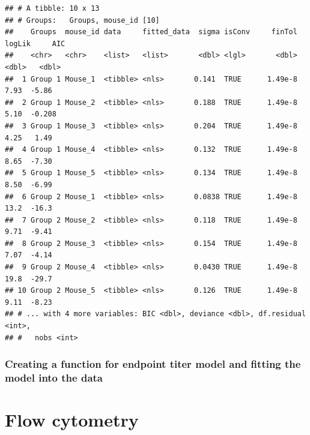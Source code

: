 \documentclass[
]{book}
\begin{document}
\begin{verbatim}
## # A tibble: 10 x 13
## # Groups:   Groups, mouse_id [10]
##    Groups  mouse_id data     fitted_data  sigma isConv     finTol logLik     AIC
##    <chr>   <chr>    <list>   <list>       <dbl> <lgl>       <dbl>  <dbl>   <dbl>
##  1 Group 1 Mouse_1  <tibble> <nls>       0.141  TRUE      1.49e-8   7.93  -5.86 
##  2 Group 1 Mouse_2  <tibble> <nls>       0.188  TRUE      1.49e-8   5.10  -0.208
##  3 Group 1 Mouse_3  <tibble> <nls>       0.204  TRUE      1.49e-8   4.25   1.49 
##  4 Group 1 Mouse_4  <tibble> <nls>       0.132  TRUE      1.49e-8   8.65  -7.30 
##  5 Group 1 Mouse_5  <tibble> <nls>       0.134  TRUE      1.49e-8   8.50  -6.99 
##  6 Group 2 Mouse_1  <tibble> <nls>       0.0838 TRUE      1.49e-8  13.2  -16.3  
##  7 Group 2 Mouse_2  <tibble> <nls>       0.118  TRUE      1.49e-8   9.71  -9.41 
##  8 Group 2 Mouse_3  <tibble> <nls>       0.154  TRUE      1.49e-8   7.07  -4.14 
##  9 Group 2 Mouse_4  <tibble> <nls>       0.0430 TRUE      1.49e-8  19.8  -29.7  
## 10 Group 2 Mouse_5  <tibble> <nls>       0.126  TRUE      1.49e-8   9.11  -8.23 
## # ... with 4 more variables: BIC <dbl>, deviance <dbl>, df.residual <int>,
## #   nobs <int>
\end{verbatim}

\hypertarget{creating-a-function-for-endpoint-titer-model-and-fitting-the-model-into-the-data}{%
\subsection{Creating a function for endpoint titer model and fitting the model into the data}\label{creating-a-function-for-endpoint-titer-model-and-fitting-the-model-into-the-data}}

\hypertarget{flow-cytometry}{%
\chapter{Flow cytometry}\label{flow-cytometry}}

  
\end{document}

